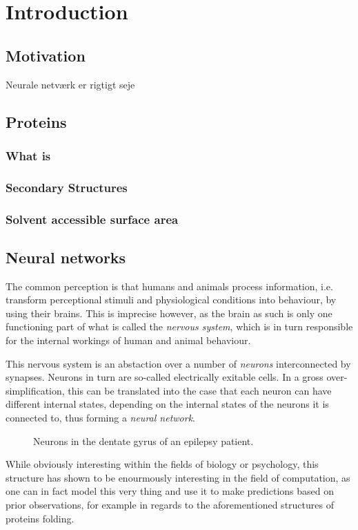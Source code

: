 \section{Introduction}
\subsection{Motivation}
Neurale netværk er rigtigt seje \cite{bishop2006}
\subsection{Proteins}
\subsubsection{What is}
\subsubsection{Secondary Structures}
\subsubsection{Solvent accessible surface area}
\subsection{Neural networks}
The common perception is that humans and animals process information, i.e. transform perceptional 
stimuli and physiological conditions into behaviour, by using their brains. This is imprecise 
however, as the brain as such is only one functioning part of what is called the \textit{nervous 
system}, which is in turn responsible for the internal workings of human and animal behaviour.

This nervous system is an abstaction over a number of \textit{neurons} interconnected by 
synapses. Neurons in turn are so-called electrically exitable cells. In a gross over-simplification, this can be translated into the case that each neuron can have different internal states, depending on the internal states of the neurons it is connected to, thus forming a \textit{neural network}.

\begin{figure}[h]
  \centering
  \caption{Neurons in the dentate gyrus of an epilepsy patient.}
\end{figure}

While obviously interesting within the fields of biology or psychology, this structure has shown 
to be enourmously interesting in the field of computation, as one can in fact model this very 
thing and use it to make predictions based on prior observations, for example in regards to the 
aforementioned structures of proteins folding.

